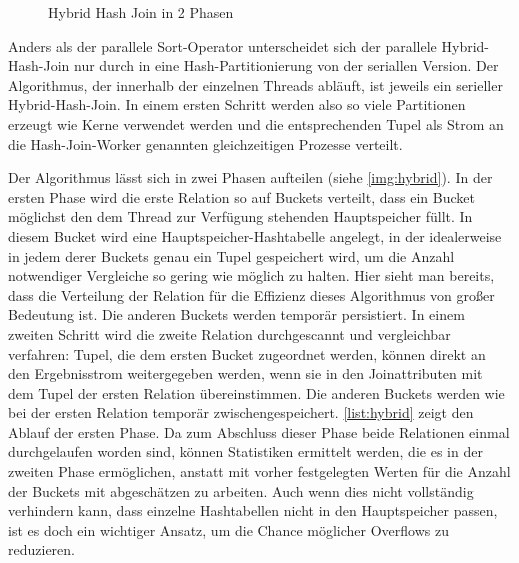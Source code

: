 \documentclass[a4paper,12pt,twoside]{article}
\begin{document}
\begin{figure}
	\centering
	\qquad
	\caption{Hybrid Hash Join in 2 Phasen \autocite{Richly2009}}
	\label{img:hybrid}
\end{figure}

Anders als der parallele Sort-Operator unterscheidet sich der parallele Hybrid-Hash-Join nur durch in eine Hash-Partitionierung von der seriallen Version. Der Algorithmus, der innerhalb der einzelnen Threads abläuft, ist jeweils ein serieller Hybrid-Hash-Join. In einem ersten Schritt werden also so viele Partitionen erzeugt wie Kerne verwendet werden und die entsprechenden Tupel als Strom an die Hash-Join-Worker genannten gleichzeitigen Prozesse verteilt.

Der Algorithmus lässt sich in zwei Phasen aufteilen (siehe \autoref{img:hybrid}). In der ersten Phase wird die erste Relation so auf Buckets verteilt, dass ein Bucket möglichst den dem Thread zur Verfügung stehenden Hauptspeicher füllt. In diesem Bucket wird eine Hauptspeicher-Hashtabelle angelegt, in der idealerweise in jedem derer Buckets genau ein Tupel gespeichert wird, um die Anzahl notwendiger Vergleiche so gering wie möglich zu halten. Hier sieht man bereits, dass die Verteilung der Relation für die Effizienz dieses Algorithmus von großer Bedeutung ist. Die anderen Buckets werden temporär persistiert. In einem zweiten Schritt wird die zweite Relation durchgescannt und vergleichbar verfahren: Tupel, die dem ersten Bucket zugeordnet werden, können direkt an den Ergebnisstrom weitergegeben werden, wenn sie in den Joinattributen mit dem Tupel der ersten Relation übereinstimmen. Die anderen Buckets werden wie bei der ersten Relation temporär zwischengespeichert. \autoref{list:hybrid} zeigt den Ablauf der ersten Phase. Da zum Abschluss dieser Phase beide Relationen einmal durchgelaufen worden sind, können Statistiken ermittelt werden, die es in der zweiten Phase ermöglichen, anstatt mit vorher festgelegten Werten für die Anzahl der Buckets mit abgeschätzen zu arbeiten. Auch wenn dies nicht vollständig verhindern kann, dass einzelne Hashtabellen nicht in den Hauptspeicher passen, ist es doch ein wichtiger Ansatz, um die Chance möglicher Overflows zu reduzieren.   
\end{document}
